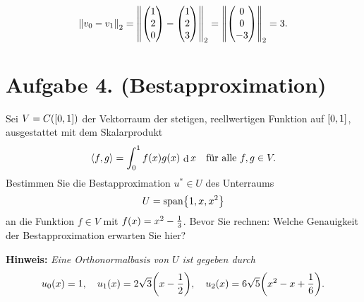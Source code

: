 \documentclass[german,12pt]{homework}
\newcommand{\dotproduct}[2]{\left\langle{#1, #2}\right\rangle}
\newcommand{\dd}{\,\differ}
\DeclareMathOperator{\differ}{d}
\DeclareMathOperator{\vecspan}{span}
\DeclarePairedDelimiter{\norm}{\lVert}{\rVert}
\DeclarePairedDelimiter{\enbrace}{(}{)}
\DeclarePairedDelimiter{\benbrace}{[}{]}
\DeclarePairedDelimiter{\penbrace}{\{}{\}}
\begin{document}
\begin{enumerate}
        \[\norm*{v_0 - v_1}_2 = \norm*{\begin{pmatrix}1\\2\\0\end{pmatrix}
        - \begin{pmatrix}1\\2\\3\end{pmatrix}}_2 = \norm*{\begin{pmatrix}
        0\\0\\-3\end{pmatrix}}_2 = 3.\]
    \end{enumerate}

    \section*{Aufgabe 4. (Bestapproximation)}

    \begin{problem}
        Sei \(V = C\enbrace*{\benbrace*{0, 1}}\) der Vektorraum der stetigen,
        reellwertigen Funktion auf \(\benbrace*{0, 1}\), ausgestattet mit dem
        Skalarprodukt
        \[\dotproduct{f}{g} = \int_0^1f\enbrace*{x}g\enbrace*{x}\dd{x} \quad
        \text{für alle }f, g \in V.\]
        Bestimmen Sie die Bestapproximation \(u^* \in U\) des Unterraums
        \[U = \vecspan\penbrace*{1, x, x^2}\]
        an die Funktion \(f \in V\) mit \(f\enbrace*{x} = x^2 - \frac{1}{3}\).
        Bevor Sie rechnen: Welche Genauigkeit der Bestapproximation erwarten
        Sie hier?

        \textbf{Hinweis:} \quad \emph{Eine Orthonormalbasis von \(U\) ist
        gegeben durch
        \[u_0\enbrace*{x} = 1, \quad u_1\enbrace*{x} = 2\sqrt{3}\enbrace*{x -
        \frac{1}{2}}, \quad u_2\enbrace*{x} = 6\sqrt{5}\enbrace*{x^2 - x +
        \frac{1}{6}}.\]}
    \end{problem}
\end{document}

